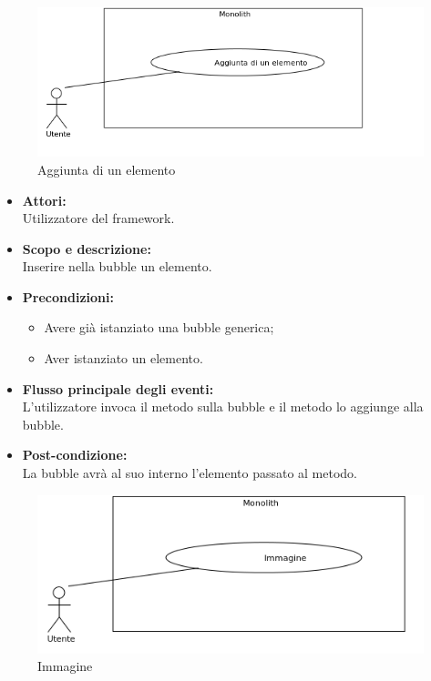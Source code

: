 
\begin{figure}[H]
	\centering
	\includegraphics[width=15cm]{../../documenti/AnalisiDeiRequisiti/Diagrammi_img/uc1_04.png}
	\caption{\UCCaption{} Aggiunta di un elemento}
\end{figure}

\begin{itemize}
	\item \textbf{Attori:}
	\\Utilizzatore del framework.
	\item \textbf{Scopo e descrizione:} 
	\\Inserire nella bubble un elemento.
	\item \textbf{Precondizioni:}
	\begin{itemize}
		\item Avere già istanziato una bubble generica;
		\item Aver istanziato un elemento.
	\end{itemize}
	\item \textbf{Flusso principale degli eventi:}
	\\L'utilizzatore invoca il metodo sulla bubble e il metodo lo aggiunge alla bubble.
	\item \textbf{Post-condizione:}
	\\La bubble avrà al suo interno l'elemento passato al metodo.
\end{itemize}


\begin{figure}[H]
	\centering
	\includegraphics[width=15cm]{../../documenti/AnalisiDeiRequisiti/Diagrammi_img/uc1_25.png}
	\caption{\UCFCaption{} Immagine}
\end{figure}

